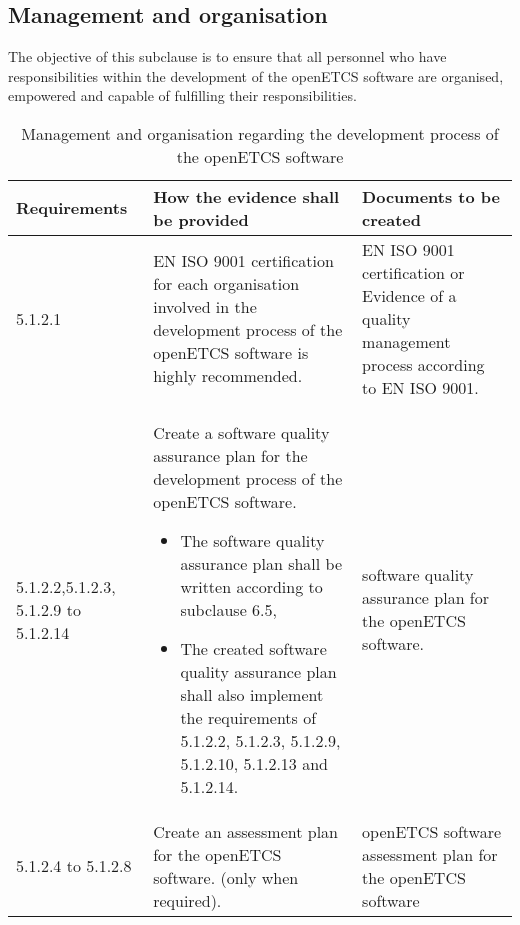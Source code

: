 \documentclass{template/openetcs_report}
\begin{document}
\subsection{Management and organisation}
\begin{flushleft}
The objective of this subclause is to ensure that all personnel who have responsibilities within the development of the openETCS software are organised, empowered and capable of fulfilling their responsibilities.
\end{flushleft}
{\footnotesize\sffamily\centering
\begin{longtable}{|p{2cm}|p{9cm}|p{3cm}|}
\caption{Management and organisation regarding the development process of the openETCS software}\\
\hline
\bfseries Requirements & \bfseries How the evidence shall be provided & \bfseries Documents to be created\\
\hline
\hline
\endhead
\hline
\endfoot

5.1.2.1 & EN ISO 9001 certification for each organisation involved in the development process of the openETCS software is highly recommended. & EN ISO 9001 certification or 
Evidence of a quality management process according to EN ISO 9001.\\ 
\hline
5.1.2.2,5.1.2.3, 5.1.2.9 to 5.1.2.14 & Create a software quality assurance plan for the development process of the openETCS software.  
\begin{itemize}\itemsep=0pt
  \item The software quality assurance plan shall be written according to subclause 6.5,
  \item The created software quality assurance plan shall also implement the requirements of 5.1.2.2, 5.1.2.3, 5.1.2.9, 5.1.2.10, 5.1.2.13 and 5.1.2.14. 
\end{itemize}
& software quality assurance plan for the openETCS software.\\ 
\hline
5.1.2.4 to 5.1.2.8 & Create an assessment plan for the openETCS software. (only when required).
& openETCS software assessment plan for the openETCS software\\ 
\hline
\end{longtable}}
\end{document}
